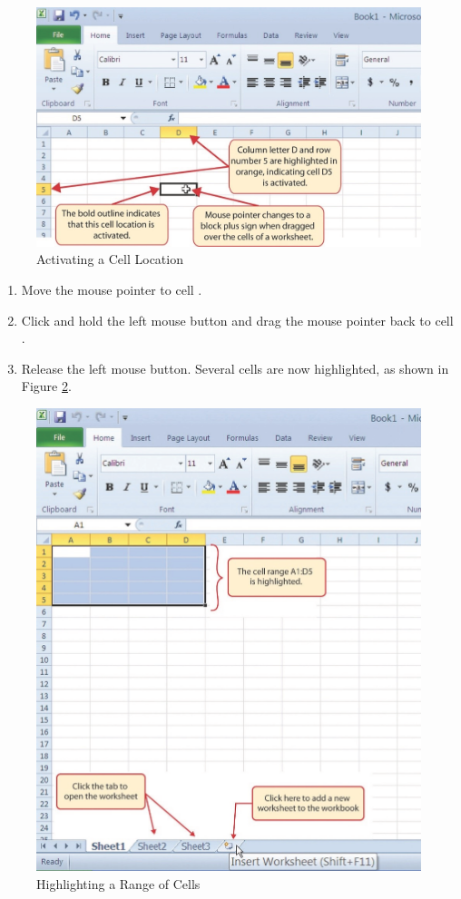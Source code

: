 \begin{figure}[H]
	\centering
	\includegraphics[width=\maxwidth{.95\linewidth}]{gfx/ch01_fig04}
	\caption{Activating a Cell Location}
	\label{01:fig04}
\end{figure}

\begin{enumerate}
	\item Move the mouse pointer to cell .
	\item Click and hold the left mouse button and drag the mouse pointer back to cell .
	\item Release the left mouse button. Several cells are now highlighted, as shown in Figure \ref{01:fig05}.
\end{enumerate}

\begin{figure}[H]
	\centering
	\includegraphics[width=\maxwidth{.95\linewidth}]{gfx/ch01_fig05}
	\caption{Highlighting a Range of Cells}
	\label{01:fig05}
\end{figure}

